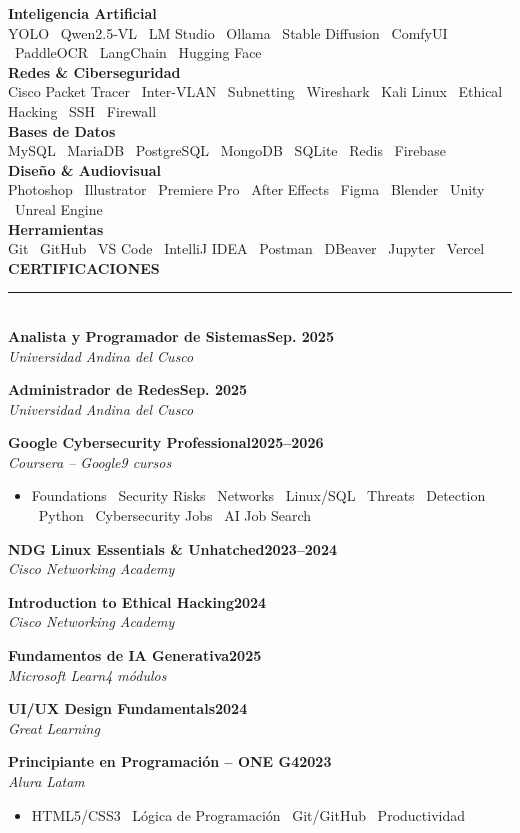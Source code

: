 \documentclass[letterpaper,10pt]{article}
\newcommand{\rsection}[1]{%
  {\vspace{2pt}\color{accentblue}\bfseries\normalsize\MakeUppercase{#1}}\\[-2pt]
  {\color{cvline}\rule{\linewidth}{0.6pt}}\\[1pt]
}
\newcommand{\cvcertfull}[4]{%
  \vspace{2pt}
  {\footnotesize\textbf{#1}\hfill\footnotesize\textbf{#2}}\\
  {\scriptsize\color{graytext}\textit{#3}\hfill\scriptsize\color{graytext}\textit{#4}}
  \vspace{0pt}
}
\newcommand{\cvbullet}{\begin{itemize}[leftmargin=0.15in,itemsep=-1pt,topsep=1pt]}
\newcommand{\cvbulletend}{\end{itemize}\vspace{2pt}}
\newcommand{\skillrow}[2]{%
  {\footnotesize\textbf{#1}}\\
  {\scriptsize\color{graytext}#2}\\[3pt]
}
\begin{document}
\begin{paracol}{2}
\skillrow{Inteligencia Artificial}{YOLO \textbullet\ Qwen2.5-VL \textbullet\ LM Studio \textbullet\ Ollama \textbullet\ Stable Diffusion \textbullet\ ComfyUI \textbullet\ PaddleOCR \textbullet\ LangChain \textbullet\ Hugging Face}

\skillrow{Redes \& Ciberseguridad}{Cisco Packet Tracer \textbullet\ Inter-VLAN \textbullet\ Subnetting \textbullet\ Wireshark \textbullet\ Kali Linux \textbullet\ Ethical Hacking \textbullet\ SSH \textbullet\ Firewall}

\skillrow{Bases de Datos}{MySQL \textbullet\ MariaDB \textbullet\ PostgreSQL \textbullet\ MongoDB \textbullet\ SQLite \textbullet\ Redis \textbullet\ Firebase}

\skillrow{Dise\~no \& Audiovisual}{Photoshop \textbullet\ Illustrator \textbullet\ Premiere Pro \textbullet\ After Effects \textbullet\ Figma \textbullet\ Blender \textbullet\ Unity \textbullet\ Unreal Engine}

\skillrow{Herramientas}{Git \textbullet\ GitHub \textbullet\ VS Code \textbullet\ IntelliJ IDEA \textbullet\ Postman \textbullet\ DBeaver \textbullet\ Jupyter \textbullet\ Vercel}

\vspace{2pt}
\rsection{Certificaciones}

\cvcertfull{Analista y Programador de Sistemas}{Sep. 2025}
{Universidad Andina del Cusco}{}

\cvcertfull{Administrador de Redes}{Sep. 2025}
{Universidad Andina del Cusco}{}

\cvcertfull{Google Cybersecurity Professional}{2025--2026}
{Coursera -- Google}{9 cursos}
\cvbullet
  \item[\small\textbullet] {\scriptsize Foundations \textbullet\ Security Risks \textbullet\ Networks \textbullet\ Linux/SQL \textbullet\ Threats \textbullet\ Detection \textbullet\ Python \textbullet\ Cybersecurity Jobs \textbullet\ AI Job Search}
\cvbulletend

\cvcertfull{NDG Linux Essentials \& Unhatched}{2023--2024}
{Cisco Networking Academy}{}

\cvcertfull{Introduction to Ethical Hacking}{2024}
{Cisco Networking Academy}{}

\cvcertfull{Fundamentos de IA Generativa}{2025}
{Microsoft Learn}{4 m\'odulos}

\cvcertfull{UI/UX Design Fundamentals}{2024}
{Great Learning}{}

\cvcertfull{Principiante en Programaci\'on -- ONE G4}{2023}
{Alura Latam}{}
\cvbullet
  \item[\small\textbullet] {\scriptsize HTML5/CSS3 \textbullet\ L\'ogica de Programaci\'on \textbullet\ Git/GitHub \textbullet\ Productividad}
\cvbulletend


\end{paracol}
\end{document}
